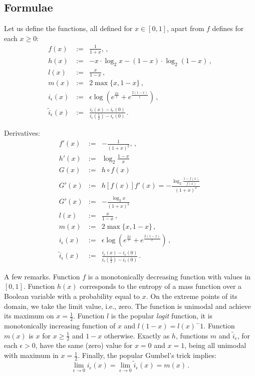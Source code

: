 \documentclass[runningheads]{llncs}
\begin{document}
	
	
	
	
	\subsection*{Formulae}
	Let us define the functions, all defined for $x\in [0,1]$, apart from $f$ defines for each 
	$x\geq 0$:
	\begin{eqnarray}
		f(x)&:=& \frac{1}{1+x},\,,\\
		h(x)&:=&-x \cdot \log_2 x - (1-x)  \cdot \log_2 (1-x)\,,\\
		l(x)&:=&\frac{x}{1-x}\,,\\
		m(x)&:=&2 \max\{x,1-x\}\,,\\
		i_\epsilon(x)&:=&\epsilon\log(e^{\frac{2x}{\epsilon}}+e^{\frac{2(1-x)}{\epsilon}})\,,\\
		\tilde{i}_\epsilon(x)&:=&\frac{i_\epsilon(x)-i_\epsilon(0)}{i_\epsilon(\frac{1}{2})-i_\epsilon(0)}\,.
	\end{eqnarray}
	
	Derivatives:
	\begin{eqnarray}
		f'(x)&:=& -\frac{1}{(1+x)^2},\,,\\
		h'(x)&:=&\log_2 \frac{1-x}{x}\,\\
		G(x) &:=& h \circ f(x)\,\\
		G'(x) &:=& h[f(x)] f'(x)=-\frac{\log_2\frac{1-f(x)}{f(x)}}{(1+x)^2}\,\\
		G'(x) &:=& -\frac{\log_2 x}{(1+x)^2}\,\\
		l(x)&:=&\frac{x}{1-x}\,,\\
		m(x)&:=&2 \max\{x,1-x\}\,,\\
		i_\epsilon(x)&:=&\epsilon\log(e^{\frac{2x}{\epsilon}}+e^{\frac{2(1-x)}{\epsilon}})\,,\\
		\tilde{i}_\epsilon(x)&:=&\frac{i_\epsilon(x)-i_\epsilon(0)}{i_\epsilon(\frac{1}{2})-i_\epsilon(0)}\,.
	\end{eqnarray}
	
	
	
	
	A few remarks. Function $f$ is a monotonically decreasing function with values in 
	$[0,1]$. Function $h(x)$ corresponds to the entropy of a mass function over a Boolean 
	variable with a probability equal to $x$. On the extreme points of its domain, we take 
	the limit value, i.e., zero. The function is unimodal and achieve its maximum on  
	$x=\frac{1}{2}$. Function $l$ is the popular \emph{logit} function, it is monotonically 
	increasing function of $x$ and $l(1-x)=l(x)^-1$. Function $m(x)$ is $x$ for $x\geq 
	\frac{1}{2}$ and $1-x$ otherwise. 
	Exactly as $h$, functions $m$ and $\tilde{i}_\epsilon$, for each $\epsilon>0$, have the 
	same (zero) value for $x=0$ and $x=1$, being all unimodal with maximum in 
	$x=\frac{1}{2}$.
	Finally, the popular Gumbel's trick implies:
	\begin{equation}
		\lim_{\epsilon \to 0} i_\epsilon(x)= 
		\lim_{\epsilon \to 0} \tilde{i}_\epsilon(x)
		= m(x)\,.
	\end{equation}
\end{document}
